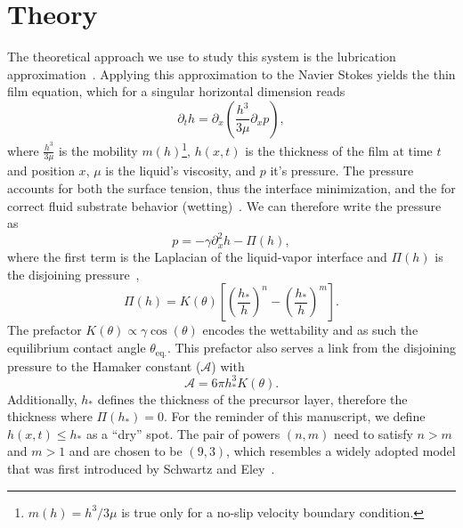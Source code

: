 \documentclass[twocolumn,amsmath,amssymb,showpacs,pre,nofootinbib,superscriptaddress]{revtex4-1} %
\begin{document}
\section{Theory}\label{sec:theory}
The theoretical approach we use to study this system is the lubrication approximation~\cite{Reynolds, RevModPhys.69.931, PhysRevE.63.011208}.
Applying this approximation to the Navier Stokes yields the thin film equation, which for a singular horizontal dimension reads~\cite{RevModPhys.81.739, RevModPhys.81.1131, THIELE2014399}
\begin{equation}\label{eq:thin_film_simple}
    \partial_t h = \partial_x \left(\frac{h^3}{3\mu}\partial_x p\right),
\end{equation}
where $\frac{h^3}{3\mu}$ is the mobility $m(h)$\footnote{$m(h) = h^3/3\mu$ is true only for a no-slip velocity boundary condition.}, $h(x,t)$ is the thickness of the film at time $t$ and position $x$, $\mu$ is the liquid's viscosity, and $p$ it's pressure.
The pressure accounts for both the surface tension, thus the interface minimization, and the for correct fluid substrate behavior (wetting)~\cite{PhysRevE.100.033313}.
We can therefore write the pressure as
\begin{equation}\label{eq:pressure}
    p = -\gamma \partial_x^2 h - \Pi(h),
\end{equation}
where the first term is the Laplacian of the liquid-vapor interface and $\Pi(h)$ is the disjoining pressure~\cite{RevModPhys.69.931, RevModPhys.81.739, Peschka9275, PhysRevE.63.011208},
\begin{equation}\label{eq:disjoin}
    \Pi(h) = K(\theta)\left[\left(\frac{h_{\ast}}{h}\right)^n - \left(\frac{h_{\ast}}{h}\right)^m\right].
\end{equation}
The prefactor $K(\theta)\propto \gamma\cos(\theta)$ encodes the wettability and as such the equilibrium contact angle $\theta_{\text{eq.}}$.
This prefactor also serves a link from the disjoining pressure to the Hamaker constant ($\mathcal{A}$) with~~\cite{PhysRevE.93.013120, bestehorn20033d, van1988interfacial}
\begin{equation}
    \mathcal{A} = 6\pi h_{\ast}^3 K(\theta).    
\end{equation}
Additionally, $h_{\ast}$ defines the thickness of the precursor layer, therefore the thickness where $\Pi(h_{\ast}) = 0$.
For the reminder of this manuscript, we define $h(x,t) \le h_{\ast}$ as a ``dry'' spot.
The pair of powers $(n,m)$ need to satisfy $n > m$ and $m > 1$ and are chosen to be $(9,3)$, which resembles a  widely adopted model that was first introduced by Schwartz and Eley~\cite{SCHWARTZ1998173, RevModPhys.81.739}.
\end{document}
